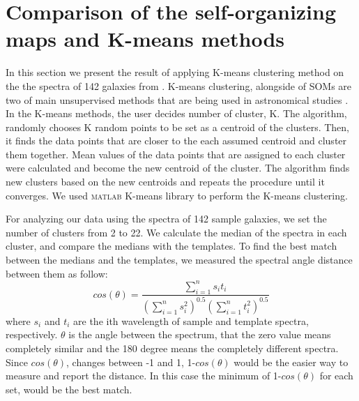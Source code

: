 \newpage

\section{Comparison of the self-organizing maps and K-means methods}
\label{app: high_Z_1d_k-means}


In this section we present the result of applying  K-means clustering method on the the spectra of 142 galaxies from .
K-means clustering, alongside of SOMs are two of main unsupervised methods that are being used in astronomical studies \citep[e.g.][]{DAbrusco12, Aycha16}.
In the K-means methods, the user decides number of cluster, K. 
The algorithm, randomly chooses K random points to be set as a centroid of the clusters.
Then, it finds the data points that are closer to the each assumed centroid and cluster them together.
Mean values of the data points that are assigned to each cluster were calculated and become the new centroid of the cluster. 
The algorithm finds new clusters based on the new centroids and repeats the procedure until it converges. 
We used \textsc{matlab} K-means library to perform the K-means clustering.

For analyzing our data using the spectra of 142 sample galaxies, we set the number of clusters from 2 to 22.
We calculate the median of the spectra in each cluster, and compare the medians with the  templates.
To find the best match between the medians and the templates, we measured the spectral angle distance between them as follow:
\begin{equation}
    cos(\theta) = \frac{\sum_{i=1}^{n} s_it_i}{(\sum_{i=1}^{n} s^2_i)^{0.5} (\sum_{i=1}^{n} t^2_i)^{0.5}}
\end{equation}
where $s_i$ and $t_i$ are the ith wavelength of sample and template spectra, respectively. 
$\theta$ is the angle between the spectrum, that the zero value means completely similar and the 180  degree means the completely different spectra. Since $cos(\theta)$, changes between -1 and 1, 1-$cos(\theta)$ would be the easier way to measure and report the distance.
In this case the minimum of 1-$cos(\theta)$ for each set, would be the best match.


